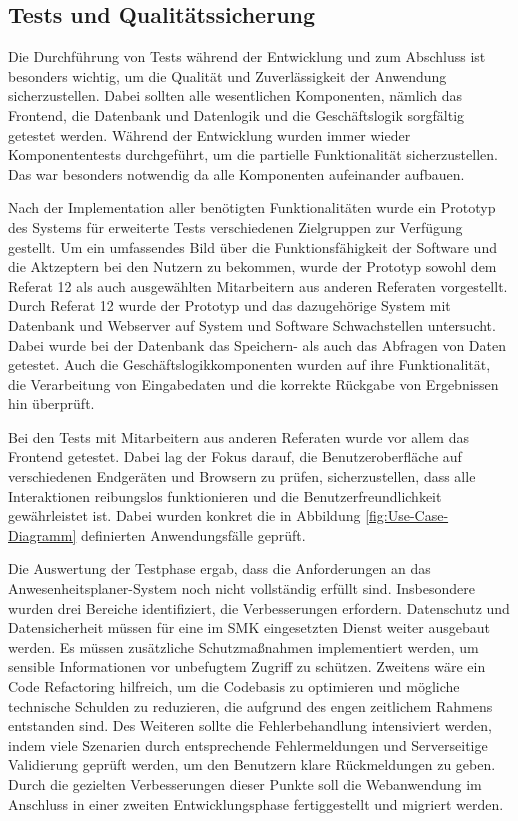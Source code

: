 \subsection{Tests und Qualitätssicherung}
\label{sec:Tests}
Die Durchführung von Tests während der Entwicklung und zum Abschluss ist besonders wichtig, um die Qualität und Zuverlässigkeit der Anwendung sicherzustellen. Dabei sollten alle wesentlichen Komponenten, nämlich das Frontend, die Datenbank und Datenlogik und die Geschäftslogik sorgfältig getestet werden. Während der Entwicklung wurden immer wieder Komponententests durchgeführt, um die partielle Funktionalität sicherzustellen. Das war besonders notwendig da alle Komponenten aufeinander aufbauen.

Nach der Implementation aller benötigten Funktionalitäten wurde ein Prototyp des Systems für erweiterte Tests verschiedenen Zielgruppen zur Verfügung gestellt. Um ein umfassendes Bild über die Funktionsfähigkeit der Software und die Aktzeptern bei den Nutzern zu bekommen, wurde der Prototyp sowohl dem Referat 12 als auch ausgewählten Mitarbeitern aus anderen Referaten vorgestellt. Durch Referat 12 wurde der Prototyp und das dazugehörige System mit Datenbank und Webserver auf System und Software Schwachstellen untersucht. Dabei wurde bei der Datenbank das Speichern- als auch das Abfragen von Daten getestet. Auch die Geschäftslogikkomponenten wurden auf ihre Funktionalität, die Verarbeitung von Eingabedaten und die korrekte Rückgabe von Ergebnissen hin überprüft.

Bei den Tests mit Mitarbeitern aus anderen Referaten wurde vor allem das Frontend getestet. Dabei lag der Fokus darauf, die Benutzeroberfläche auf verschiedenen Endgeräten und Browsern zu prüfen, sicherzustellen, dass alle Interaktionen reibungslos funktionieren und die Benutzerfreundlichkeit gewährleistet ist. Dabei wurden konkret die in Abbildung \ref{fig:Use-Case-Diagramm} definierten Anwendungsfälle geprüft.

Die Auswertung der Testphase ergab, dass die Anforderungen an das Anwesenheitsplaner-System noch nicht vollständig erfüllt sind. Insbesondere wurden drei Bereiche identifiziert, die Verbesserungen erfordern. Datenschutz und Datensicherheit müssen für eine im SMK eingesetzten Dienst weiter ausgebaut werden. Es müssen zusätzliche Schutzmaßnahmen implementiert werden, um sensible Informationen vor unbefugtem Zugriff zu schützen. Zweitens wäre ein Code Refactoring hilfreich, um die Codebasis zu optimieren und mögliche technische Schulden zu reduzieren, die aufgrund des engen zeitlichem Rahmens entstanden sind. Des Weiteren sollte die Fehlerbehandlung intensiviert werden, indem viele Szenarien durch entsprechende Fehlermeldungen und Serverseitige Validierung geprüft werden, um den Benutzern klare Rückmeldungen zu geben. Durch die gezielten Verbesserungen dieser Punkte soll die Webanwendung im Anschluss in einer zweiten Entwicklungsphase fertiggestellt und migriert werden.
